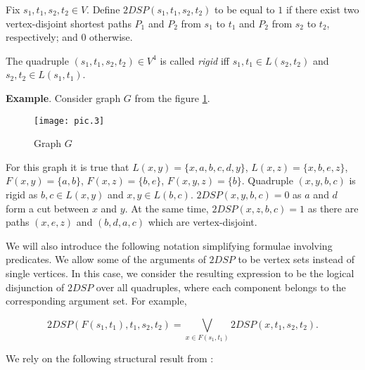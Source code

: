 \begin{definition}
Fix $s_1, t_1, s_2, t_2 \in V$. Define $2DSP(s_1, t_1, s_2, t_2)$ to be equal to $1$ if there exist two vertex-disjoint shortest paths $P_1$ and $P_2$ from $s_1$ to $t_1$ and $P_2$ from $s_2$ to $t_2$, respectively; and $0$ otherwise.
\end{definition}

\begin{definition}
The quadruple $(s_1, t_1, s_2, t_2) \in V^4$ is called \textit{rigid} iff $s_1, t_1 \in L(s_2, t_2)$ and $s_2, t_2 \in L(s_1, t_1)$.
\end{definition}

\textbf{Example}. Consider graph $G$ from the figure \ref{pic:exmp}.

\begin{figure}[H]
\caption{Graph $G$}
\label{pic:exmp}
\centering
\texttt{[image: pic.3]}
\end{figure}

For this graph it is true that $L(x, y) = \{x, a, b, c, d, y\}$, $L(x, z) = \{x, b, e, z\}$, $F(x, y) = \{a, b\}$, $F(x, z) = \{b, e\}$, $F(x, y, z) = \{b\}$. Quadruple $(x, y, b, c)$ is rigid as $b, c \in L(x, y)$ and $x, y \in L(b, c)$. $2DSP(x, y, b, c) = 0$ as $a$ and $d$ form a cut between $x$ and $y$. At the same time, $2DSP(x, z, b, c) = 1$ as there are paths $(x, e, z)$ and $(b, d, a, c)$ which are vertex-disjoint.

We will also introduce the following notation simplifying formulae involving predicates. We allow some of the arguments of $2DSP$ to be vertex sets instead of single vertices. In this case, we consider the resulting expression to be the logical disjunction of $2DSP$ over all quadruples, where each component belongs to the corresponding argument set. For example,

\begin{equation}
2DSP(F(s_1, t_1), t_1, s_2, t_2) = \bigvee\limits_{x \in F(s_1, t_1)} 2DSP(x, t_1, s_2, t_2).
\end{equation}

We rely on the following structural result from \cite{ET}:

